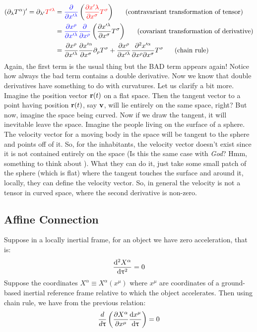 \begin{align*}
    (\partial_\lambda T^\alpha)' = \partial_{\lambda'}\mathcolor{red}{T'^\lambda}&= \mathcolor{blue}{\frac{\partial}{\partial x'^\lambda}}\brac{\mathcolor{red}{\pdv{x'\lambda}{x^\sigma}T^\sigma}} \quad \ \ (\text{contravariant transformation of tensor})\\
    &= \mathcolor{blue}{\pdv{x^\rho}{x'^\lambda}\frac{\partial}{\partial x^\rho}}\brac{{\pdv{x'^\lambda}{x^\sigma}T^\sigma}}\quad \ \ (\text{covariant transformation of derivative})\\
    &= \pdv{x^\rho}{x'^\lambda}\pdv{x'^\alpha}{x^\sigma}\partial_\rho T^\sigma + \pdv{x^\rho}{x'^\lambda}\pdv{x'^\alpha}{x^\rho}{x^\sigma}T^\sigma \quad \ \ (\text{chain rule})
\end{align*}
Again, the first term is the usual thing but the BAD term appears again! Notice how always the bad term contains a double derivative. Now we know that double derivatives have something to do with curvatures. Let us clarify a bit more.\\[0.3cm]
Imagine the position vector $\boldsymbol{\mathbf{r}}(t)$ on a flat space. Then the tangent vector to a point having position $\boldsymbol{\mathbf{r}}(t)$, say $\boldsymbol{\mathbf{v}}$, will lie entirely on the same space, right? But now, imagine the space being curved. Now if we draw the tangent, it will inevitable leave the space. Imagine the people living on the surface of a sphere. The velocity vector for a moving body in the space will be tangent to the sphere and points off of it. So, for the inhabitants, the velocity vector doesn't exist since it is not contained entirely on the space (Is this the same case with \textit{God}? Hmm, something to think about ). What they can do it, just take some small patch of the sphere (which is flat) where the tangent touches the surface and around it, locally, they can define the velocity vector. So, in general the velocity is not a tensor in curved space, where the second derivative is non-zero. 

%     
\subsection{Affine Connection}
Suppose in a locally inertial frame, for an object we have zero acceleration, that is:
$$\dv[2]{X^\alpha}{\uptau} = 0$$
Suppose the coordinates $X^\alpha \equiv X^\alpha(x^\mu)$ where $x^\mu$ are coordinates of a ground-based inertial reference frame relative to which the object accelerates. Then using chain rule, we have from the previous relation:
$$\frac{d}{d\uptau}\left( \pdv{X^\alpha}{x^\mu}\dv{x^\mu}{\uptau} \right) = 0$$

